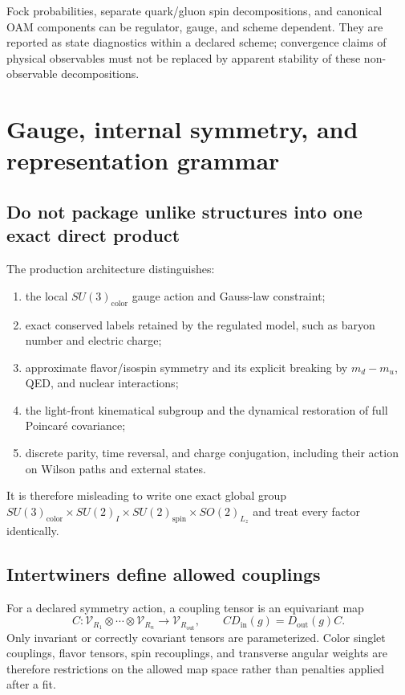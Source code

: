 \documentclass[11pt]{article}
\newcommand{\Rep}{\mathcal V}
\begin{document}
Fock probabilities, separate quark/gluon spin decompositions, and canonical
OAM components can be regulator, gauge, and scheme dependent.  They are
reported as state diagnostics within a declared scheme; convergence claims
of physical observables must not be replaced by apparent stability of these
non-observable decompositions.

\section{Gauge, internal symmetry, and representation grammar}
\label{sec:symmetry}

\subsection{Do not package unlike structures into one exact direct product}

The production architecture distinguishes:
\begin{enumerate}
\item the local \(SU(3)_{\mathrm{color}}\) gauge action and Gauss-law
constraint;
\item exact conserved labels retained by the regulated model, such as baryon
number and electric charge;
\item approximate flavor/isospin symmetry and its explicit breaking by
\(m_d-m_u\), QED, and nuclear interactions;
\item the light-front kinematical subgroup and the dynamical restoration of
full Poincar\'e covariance;
\item discrete parity, time reversal, and charge conjugation, including their
action on Wilson paths and external states.
\end{enumerate}
It is therefore misleading to write one exact global group
\(SU(3)_{\mathrm{color}}\times SU(2)_{I}\times SU(2)_{\mathrm{spin}}
\times SO(2)_{L_z}\) and treat every factor identically.

\subsection{Intertwiners define allowed couplings}

For a declared symmetry action, a coupling tensor is an equivariant map
\begin{equation}
 C:\Rep_{R_1}\otimes\cdots\otimes\Rep_{R_n}
 \longrightarrow\Rep_{R_{\mathrm{out}}},
 \qquad
 C D_{\mathrm{in}}(g)=D_{\mathrm{out}}(g)C.
\label{eq:intertwiner-definition}
\end{equation}
Only invariant or correctly covariant tensors are parameterized.  Color
singlet couplings, flavor tensors, spin recouplings, and transverse angular
weights are therefore restrictions on the allowed map space rather than
penalties applied after a fit.
\end{document}
